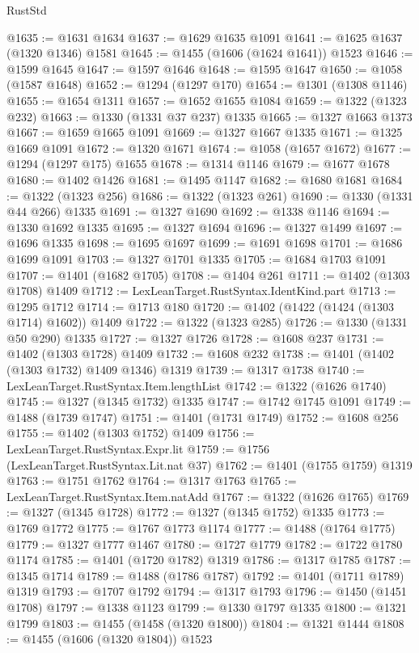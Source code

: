 \begin{lexlean}{RustStd}
\begin{coremodule}
@1635 := @1631 @1634
@1637 := @1629 @1635 @1091
@1641 := @1625 @1637 (@1320 @1346) @1581
@1645 := @1455 (@1606 (@1624 @1641)) @1523
@1646 := @1599 @1645
@1647 := @1597 @1646
@1648 := @1595 @1647
@1650 := @1058 (@1587 @1648)
@1652 := @1294 (@1297 @170)
@1654 := @1301 (@1308 @1146)
@1655 := @1654 @1311
@1657 := @1652 @1655 @1084
@1659 := @1322 (@1323 @232)
@1663 := @1330 (@1331 @37 @237) @1335
@1665 := @1327 @1663 @1373
@1667 := @1659 @1665 @1091
@1669 := @1327 @1667 @1335
@1671 := @1325 @1669 @1091
@1672 := @1320 @1671
@1674 := @1058 (@1657 @1672)
@1677 := @1294 (@1297 @175) @1655
@1678 := @1314 @1146
@1679 := @1677 @1678
@1680 := @1402 @1426
@1681 := @1495 @1147
@1682 := @1680 @1681
@1684 := @1322 (@1323 @256)
@1686 := @1322 (@1323 @261)
@1690 := @1330 (@1331 @44 @266) @1335
@1691 := @1327 @1690
@1692 := @1338 @1146
@1694 := @1330 @1692 @1335
@1695 := @1327 @1694
@1696 := @1327 @1499
@1697 := @1696 @1335
@1698 := @1695 @1697
@1699 := @1691 @1698
@1701 := @1686 @1699 @1091
@1703 := @1327 @1701 @1335
@1705 := @1684 @1703 @1091
@1707 := @1401 (@1682 @1705)
@1708 := @1404 @261
@1711 := @1402 (@1303 @1708) @1409
@1712 := LexLeanTarget.RustSyntax.IdentKind.part
@1713 := @1295 @1712
@1714 := @1713 @180
@1720 := @1402 (@1422 (@1424 (@1303 @1714) @1602)) @1409
@1722 := @1322 (@1323 @285)
@1726 := @1330 (@1331 @50 @290) @1335
@1727 := @1327 @1726
@1728 := @1608 @237
@1731 := @1402 (@1303 @1728) @1409
@1732 := @1608 @232
@1738 := @1401 (@1402 (@1303 @1732) @1409 @1346) @1319
@1739 := @1317 @1738
@1740 := LexLeanTarget.RustSyntax.Item.lengthList
@1742 := @1322 (@1626 @1740)
@1745 := @1327 (@1345 @1732) @1335
@1747 := @1742 @1745 @1091
@1749 := @1488 (@1739 @1747)
@1751 := @1401 (@1731 @1749)
@1752 := @1608 @256
@1755 := @1402 (@1303 @1752) @1409
@1756 := LexLeanTarget.RustSyntax.Expr.lit
@1759 := @1756 (LexLeanTarget.RustSyntax.Lit.nat @37)
@1762 := @1401 (@1755 @1759) @1319
@1763 := @1751 @1762
@1764 := @1317 @1763
@1765 := LexLeanTarget.RustSyntax.Item.natAdd
@1767 := @1322 (@1626 @1765)
@1769 := @1327 (@1345 @1728)
@1772 := @1327 (@1345 @1752) @1335
@1773 := @1769 @1772
@1775 := @1767 @1773 @1174
@1777 := @1488 (@1764 @1775)
@1779 := @1327 @1777 @1467
@1780 := @1727 @1779
@1782 := @1722 @1780 @1174
@1785 := @1401 (@1720 @1782) @1319
@1786 := @1317 @1785
@1787 := @1345 @1714
@1789 := @1488 (@1786 @1787)
@1792 := @1401 (@1711 @1789) @1319
@1793 := @1707 @1792
@1794 := @1317 @1793
@1796 := @1450 (@1451 @1708)
@1797 := @1338 @1123
@1799 := @1330 @1797 @1335
@1800 := @1321 @1799
@1803 := @1455 (@1458 (@1320 @1800))
@1804 := @1321 @1444
@1808 := @1455 (@1606 (@1320 @1804)) @1523

\end{coremodule}
\end{lexlean}
